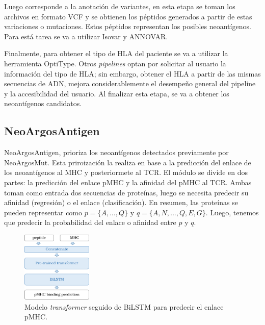 \documentclass[a4paper,11pt]{article}
\begin{document}
Luego corresponde a la anotación de variantes, en esta etapa se toman los archivos en formato VCF y se obtienen los péptidos generados a partir de estas variaciones o mutaciones. Estos péptidos representan los posibles neoantígenos. Para está tarea se va a utilizar Isovar y ANNOVAR. 


Finalmente, para obtener el tipo de HLA del paciente se va a utilizar la herramienta OptiType. Otros \textit{pipelines} optan por solicitar al usuario la información del tipo de HLA; sin embargo, obtener el HLA a partir de las mismas secuencias de ADN, mejora considerablemente el desempeño general del pipeline y la accesibilidad del usuario. Al  finalizar esta etapa, se va a obtener los neoantígenos candidatos.


\subsection{NeoArgosAntigen}

NeoArgosAntigen, prioriza los neoantígenos detectados previamente por NeoArgosMut. Esta priroización la realiza en base a la predicción del enlace de los neoantígenos al MHC y posteriormete al TCR. El módulo se divide en dos partes: la predicción del enlace pMHC y la afinidad del pMHC al TCR. Ambas toman como entrada dos secuencias de proteínas, luego se necesita predecir su afinidad (regresión) o el enlace (clasificación). En resumen, las proteínas se pueden representar como $p = \{ A, ... , Q \}$ y $q = \{ A, N, ... ,Q, E, G \}$. Luego, tenemos que  predecir la probabilidad del enlace o afinidad entre $p$ y $q$. 


\begin{figure}
	\centering
	\includegraphics[width=0.30\textwidth]{../img/pipeline/proposal_pmhc}
	\caption{Modelo  \textit{transformer} seguido de BiLSTM para predecir el enlace pMHC.}
	\label{fig:proposal}
\end{figure}
\end{document}

